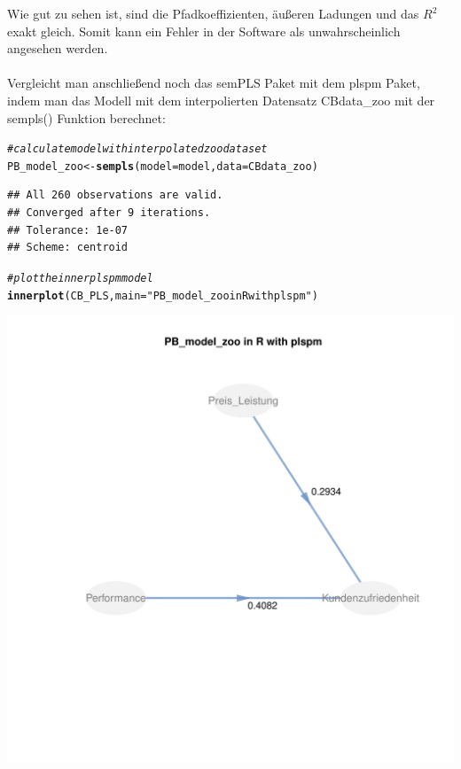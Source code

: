 \documentclass{article}\usepackage[]{graphicx}\usepackage[]{color}
\makeatletter
\def\maxwidth{ %
  \ifdim\Gin@nat@width>\linewidth
    \linewidth
  \else
    \Gin@nat@width
  \fi
}
\newcommand{\hlstr}[1]{\textcolor[rgb]{0.192,0.494,0.8}{#1}}%
\newcommand{\hlcom}[1]{\textcolor[rgb]{0.678,0.584,0.686}{\textit{#1}}}%
\newcommand{\hlstd}[1]{\textcolor[rgb]{0.345,0.345,0.345}{#1}}%
\newcommand{\hlkwb}[1]{\textcolor[rgb]{0.69,0.353,0.396}{#1}}%
\newcommand{\hlkwc}[1]{\textcolor[rgb]{0.333,0.667,0.333}{#1}}%
\newcommand{\hlkwd}[1]{\textcolor[rgb]{0.737,0.353,0.396}{\textbf{#1}}}%
\newenvironment{kframe}{%
 \def\at@end@of@kframe{}%
 \ifinner\ifhmode%
  \def\at@end@of@kframe{\end{minipage}}%
  \begin{minipage}{\columnwidth}%
 \fi\fi%
 \def\FrameCommand##1{\hskip\@totalleftmargin \hskip-\fboxsep
 \colorbox{shadecolor}{##1}\hskip-\fboxsep
     \hskip-\linewidth \hskip-\@totalleftmargin \hskip\columnwidth}%
 \MakeFramed {\advance\hsize-\width
   \@totalleftmargin\z@ \linewidth\hsize
   \@setminipage}}%
 {\par\unskip\endMakeFramed%
 \at@end@of@kframe}
\newenvironment{knitrout}{}{} %
\makeatother
\begin{document}
\pagebreak

Wie gut zu sehen ist, sind die Pfadkoeffizienten, äußeren Ladungen und das $R^{2}$ exakt gleich. Somit kann ein Fehler in der Software als unwahrscheinlich angesehen werden.\\
\\


Vergleicht man anschließend noch das semPLS Paket mit dem plspm Paket, indem man das Modell mit dem interpolierten Datensatz CBdata\_zoo mit der sempls() Funktion berechnet:
\begin{knitrout}
\color{fgcolor}\begin{kframe}
\begin{alltt}
\hlcom{#calculate model with interpolated zoo dataset}
\hlstd{PB_model_zoo} \hlkwb{<-} \hlkwd{sempls}\hlstd{(}\hlkwc{model} \hlstd{= model,}\hlkwc{data} \hlstd{= CBdata_zoo)}
\end{alltt}
\begin{verbatim}
## All 260 observations are valid.
## Converged after 9 iterations.
## Tolerance: 1e-07
## Scheme: centroid
\end{verbatim}
\begin{alltt}
\hlcom{#plot the inner plspm model}
\hlkwd{innerplot}\hlstd{(CB_PLS,} \hlkwc{main} \hlstd{=}\hlstr{"PB_model_zoo in R with plspm"}\hlstd{)}
\end{alltt}
\end{kframe}
\includegraphics[width=\maxwidth]{figure/unnamed-chunk-21} 

\end{knitrout}
\end{document}
